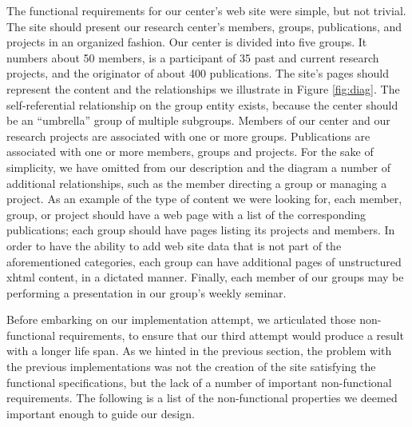 \documentclass{elsart}
\begin{document}
The functional requirements for our center's web site were
simple, but not trivial.
The site should present our research center's members, groups, publications,
and projects in an organized fashion.
Our center is divided into five groups.
It numbers about 50 members, is a participant of 35 past and current research
projects, and the originator of about 400 publications.
The site's pages should represent the content and the relationships
we illustrate in Figure \ref{fig:diag}.
The self-referential relationship on the group entity exists, because the center should be an ``umbrella'' group of multiple subgroups. Members of our center and our research projects are associated
with one or more groups.
Publications are associated
with one or more members, groups and projects.
For the sake of simplicity,
we have omitted from our description and the diagram
a number of additional relationships,
such as the member directing a group or managing a project.
As an example of the type of content we were looking for, 
each member, group, or project should have a web page with a list
of the corresponding publications;
each group should have pages listing its projects and members. 
In order to have the ability to add web site data that is not part of the aforementioned categories,
each group can have additional pages of unstructured {\sc xhtml} content, in a dictated manner.
Finally, each member of our groups may be performing a presentation in our group's weekly seminar.

Before embarking on our implementation attempt,
we articulated those non-functional requirements, to ensure that our 
third attempt would produce
a result with a longer life span.
As we hinted in the previous section, the problem with
the previous implementations was not the creation of the site
satisfying the functional specifications,
but the lack of a number of important non-functional requirements.
The following is a list of the non-functional properties
we deemed important enough to guide our design.
\end{document}

